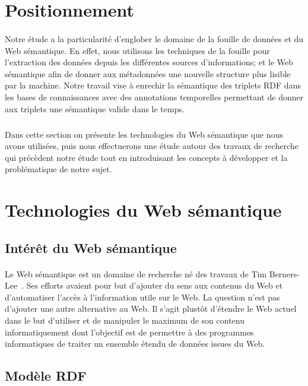 \documentclass[12pt,a4]{report}
\begin{document}
\section{Positionnement}
\paragraph{}
Notre étude a la particularité d’englober le domaine de la fouille de données et du Web sémantique. 
En effet, nous utilisons les techniques de la fouille pour l'extraction des données depuis les différentes sources d'informations; et le Web sémantique afin de donner aux métadonnées une nouvelle structure plus lisible par la machine. Notre travail vise à enrechir la sémantique des triplets RDF dans les bases de connaissances avec des annotations temporelles permettant de donner aux triplets une sémantique valide dans le temps.
\subparagraph{}
Dans cette section on présente les technologies du Web sémantique que nous avons utilisées, puis nous effectuerons une étude autour des travaux de recherche qui précèdent notre étude tout en introduisant les concepts à développer et la problématique de notre sujet.
\section{Technologies du Web sémantique}
\subsection{Intérêt du Web sémantique}
\paragraph{}
Le Web sémantique est un domaine de recherche né des travaux de Tim Berners-Lee~\cite{Berners-lee2001}. Ses efforts avaient pour but d'ajouter du sens aux contenus du Web et d'automatiser l'accès à l'information utile sur le Web. La question n’est pas d'ajouter une autre alternative au Web. Il s’agit plustôt d'étendre le Web actuel dans le but d'utiliser et de manipuler le maximum de son contenu informatiquement dont l’objectif est de permettre à des programmes informatiques de traiter un ensemble étendu de données issues du Web.
\subsection{Modèle RDF}
\end{document}

